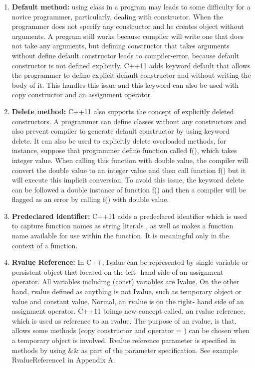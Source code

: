 \documentclass[12pt,a4paper]{report}
\begin{document}
\begin{enumerate}
\item \textbf{Default method:} using class in a program may leads to some difficulty for a novice programmer, particularly, dealing with constructor. When the programmer does not specify any constructor and he creates object without arguments. A program still works because compiler will write one that does not take any arguments, but defining constructor that takes arguments without define default constructor leads to compiler-error, because default constructor is not defined explicitly. C++11 adds keyword default that allows the programmer to define explicit default constructor and without writing the body of it. This handles this issue and this keyword can also be used with copy constructor and an assignment operator\cite{Gregorie:professionalcpp}. 

\item \textbf{Delete method:} C++11 also supports the concept of explicitly deleted constructors.  A programmer can define classes without any constructors and also prevent compiler to generate default constructor by using keyword delete.  It can also be used to explicitly delete overloaded methods, for instance, suppose that programmer define function called f(), which takes integer value. When calling this function with double value, the compiler will convert the double value to an integer value and then call function f() but it will execute this implicit conversion. To avoid this issue, the keyword delete can be followed a double instance of function f() and then a compiler will be flagged as an error by calling f() with double value\cite{Gregorie:professionalcpp}.
  
\item \textbf{Predeclared identifier:} C++11 adds a predeclared identifier which is used to capture function names as string literals , as well as makes a function name available for use within the function. It is meaningful only in the context of a function\cite{Gregorie:professionalcpp}.

\item \textbf{Rvalue Reference:} In C++, Ivalue can be represented by single variable or persistent object that located on the left- hand side of an   assignment operator. All variables including (const) variables are Ivalue. On the other hand, rvalue defined as anything is not Ivalue, such as temporary object or value and constant value. Normal, an rvalue is on the right- hand side of an assignment operator. 
\newline
C++11 brings new concept called, an rvalue reference, which is used as reference to an rvalue. The purpose of an rvalue, is that, allows some methods (copy constructor and operator = ) can be chosen when a temporary object is involved. Rvalue reference parameter is specified in methods by using \&\& as part of the parameter specification\cite{Gregorie:professionalcpp}. See example RvalueReference1 in Appendix A. 
\end{enumerate}
 
\end{document}
